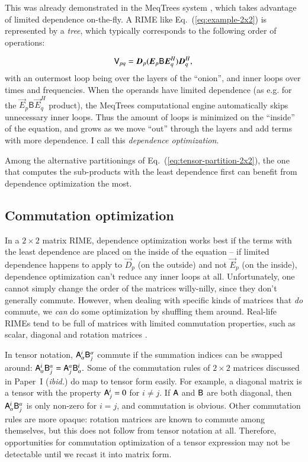 \documentclass[]{aa}
\newcommand{\herm}{H}
\newcommand{\jones}[2]{\vec {#1}_{#2}}
\newcommand{\jonesT}[2]{\vec {#1}^{\herm}_{#2}}
\newcommand{\coh}[2]{\mathsf{{#1}}_{{#2}}}
\begin{document}
This was already demonstrated in the MeqTrees system \citep{meqtrees}, which takes advantage of limited dependence on-the-fly. A RIME like Eq.~(\ref{eq:example-2x2}) is represented by a \emph{tree}, which typically corresponds to the following order of operations:

\[
  \coh{V}{pq} =  \jones{D}{p}(\jones{E}{p} \coh{B}{} \jonesT{E}{q} ) \jonesT{D}{q}, \\
\]
with an outermost loop being over the layers of the ``onion'', and inner loops over times and frequencies. When the operands have limited dependence (as e.g. for the $\jones{E}{p} \coh{B}{} \jonesT{E}{q}$ product), the MeqTrees computational engine automatically skips unnecessary inner loops. Thus the amount of loops is minimized on the ``inside'' of the equation, and grows as we move ``out'' through the layers and add terms with more dependence. I call this \emph{dependence optimization}. 

Among the alternative partitionings of Eq.~(\ref{eq:tensor-partition-2x2}), the one that computes the sub-products with the least dependence first can benefit from dependence optimization the most.

\subsection{Commutation optimization}

In a $2\times2$ matrix RIME, dependence optimization works best if the terms with the least dependence are placed on the inside of the equation -- if limited dependence happens to apply to $\jones{D}{p}$ (on the outside) and not $\jones{E}{p}$ (on the inside), dependence optimization can't reduce any inner loops at all. Unfortunately, one cannot simply change the order of the matrices willy-nilly, since they don't generally commute. However, when dealing with specific kinds of matrices that \emph{do\/} commute, we \emph{can} do some optimization by shuffling them around. Real-life RIMEs tend to be full of matrices with limited commutation properties, such as scalar, diagonal and rotation matrices \cite[see Paper~I,][Sect.~1.6]{RRIME1}.

In tensor notation, $\mathsf{A}^i_\alpha \mathsf{B}^\alpha_j$ commute if the summation indices can be swapped around: $\mathsf{A}^i_\alpha \mathsf{B}^\alpha_j=\mathsf{A}^\alpha_j \mathsf{B}^i_\alpha.$  Some of the commutation rules of $2\times2$ matrices discussed in Paper~I (\emph{ibid.}) do map to tensor form easily. For example, a diagonal matrix is a tensor with the property $\mathsf{A}^i_j=0$ for $i\ne j$. If $\mathsf{A}$ and $\mathsf{B}$ are both diagonal, then $\mathsf{A}^i_\alpha \mathsf{B}^\alpha_j$ is only non-zero for $i=j$, and commutation is obvious. Other commutation rules are more opaque: rotation matrices are known to commute among themselves, but this does not follow from tensor notation at all.
Therefore, opportunities for commutation optimization of a tensor expression may not be detectable until we recast it into matrix form. 
\end{document}
